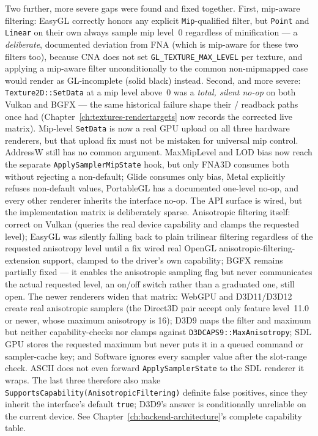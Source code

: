 Two further, more severe gaps were found and fixed together. First, mip-aware filtering:
EasyGL correctly honors any explicit \texttt{Mip}-qualified filter, but \texttt{Point} and
\texttt{Linear} on their own always sample mip level~0 regardless of minification --- a
\emph{deliberate}, documented deviation from FNA (which is mip-aware for these two filters
too), because CNA does not set \texttt{GL\_TEXTURE\_MAX\_LEVEL} per texture, and applying a
mip-aware filter unconditionally to the common non-mipmapped case would render as GL-incomplete
(solid black) instead. Second, and more severe: \texttt{Texture2D::SetData} at a mip level
above~0 was a \emph{total, silent no-op} on both Vulkan and BGFX --- the same historical
failure shape their  /  readback paths once had
(Chapter~\ref{ch:textures-rendertargets} now records the corrected live matrix). Mip-level
\texttt{SetData} is now a real GPU upload on all three hardware renderers, but that upload fix
must not be mistaken for universal  mip control. AddressW still has no
common argument. MaxMipLevel and LOD bias now reach the separate
\texttt{ApplySamplerMipState} hook, but only FNA3D consumes both without rejecting a non-default;
Glide consumes only bias, Metal explicitly refuses non-default values, PortableGL has a documented
one-level no-op, and every other renderer inherits the interface no-op. The API surface is wired,
but the implementation matrix is deliberately sparse.
Anisotropic filtering itself: correct on Vulkan (queries the real device capability and
clamps the requested level); EasyGL was silently falling back to plain trilinear filtering
regardless of the requested anisotropy level until a fix wired real
OpenGL anisotropic-filtering-extension support, clamped to the driver's own capability;
BGFX remains partially fixed --- it enables the anisotropic sampling flag but
never communicates the actual requested level, an on/off switch rather than a graduated one,
still open. The newer renderers widen that matrix: WebGPU and D3D11/D3D12 create real
anisotropic samplers (the Direct3D pair accept only feature level~11.0 or newer, whose maximum
anisotropy is 16); D3D9 maps the filter and maximum but neither capability-checks nor clamps
against \texttt{D3DCAPS9::MaxAnisotropy}; SDL GPU stores the requested maximum but never puts it
in a queued command or sampler-cache key; and Software ignores every sampler value after the
slot-range check. ASCII does not even forward \texttt{ApplySamplerState} to the SDL renderer it
wraps. The last three therefore also make
\texttt{SupportsCapability(AnisotropicFiltering)} definite false positives, since they inherit
the interface's default \texttt{true}; D3D9's answer is conditionally unreliable on the current
device. See Chapter~\ref{ch:backend-architecture}'s complete capability table.

